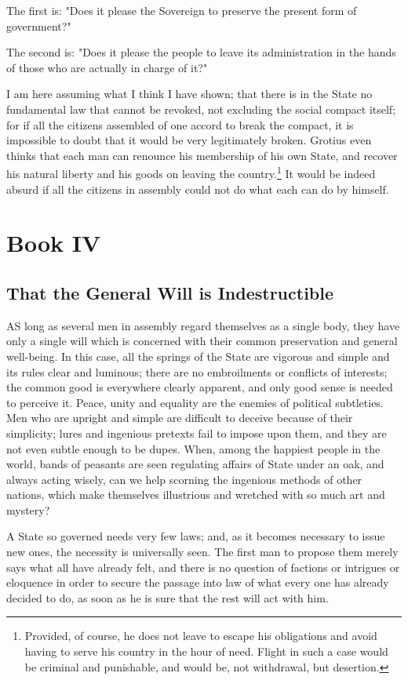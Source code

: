 \documentclass[12pt]{report}
\newcommand{\mychapter}[2]{
\setcounter{chapter}{#1}
    \setcounter{section}{0}
    \chapter*{#2}
    \addcontentsline{toc}{chapter}{#2}
}
\begin{document}
The first is: "Does it please the Sovereign to preserve the present form of government?"

The second is: "Does it please the people to leave its administration in the hands of those who are actually in charge of it?"

I am here assuming what I think I have shown; that there is in the State no fundamental law that cannot be revoked, not excluding the social compact itself; for if all the citizens assembled of one accord to break the compact, it is impossible to doubt that it would be very legitimately broken. Grotius even thinks that each man can renounce his membership of his own State, and recover his natural liberty and his goods on leaving the country.\footnote{Provided, of course, he does not leave to escape his obligations and avoid having to serve his country in the hour of need. Flight in such a case would be criminal and punishable, and would be, not withdrawal, but desertion.} It would be indeed absurd if all the citizens in assembly could not do what each can do by himself.
\mychapter{4}{Book IV}
\section{That the General Will is Indestructible}
AS long as several men in assembly regard themselves as a single body, they have only a single will which is concerned with their common preservation and general well-being. In this case, all the springs of the State are vigorous and simple and its rules clear and luminous; there are no embroilments or conflicts of interests; the common good is everywhere clearly apparent, and only good sense is needed to perceive it. Peace, unity and equality are the enemies of political subtleties. Men who are upright and simple are difficult to deceive because of their simplicity; lures and ingenious pretexts fail to impose upon them, and they are not even subtle enough to be dupes. When, among the happiest people in the world, bands of peasants are seen regulating affairs of State under an oak, and always acting wisely, can we help scorning the ingenious methods of other nations, which make themselves illustrious and wretched with so much art and mystery?

A State so governed needs very few laws; and, as it becomes necessary to issue new ones, the necessity is universally seen. The first man to propose them merely says what all have already felt, and there is no question of factions or intrigues or eloquence in order to secure the passage into law of what every one has already decided to do, as soon as he is sure that the rest will act with him.
\end{document}
